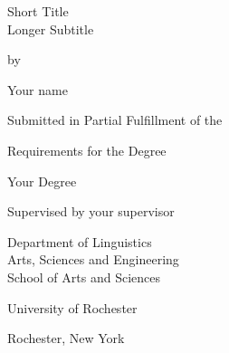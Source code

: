 \begin{titlepage}
  \vspace*{\fill}

  \begin{center}
    {\Huge Short Title \\ Longer Subtitle \par
    }

    \bigskip%
    by

    \bigskip%
    Your name


    \bigskip\bigskip\bigskip\bigskip%
    Submitted in Partial Fulfillment of the

    \bigskip%
    Requirements for the Degree

    \bigskip%
    Your Degree


    \bigskip\bigskip\bigskip\bigskip%
    Supervised by your supervisor

    \bigskip\bigskip%
    Department of Linguistics\\
    Arts, Sciences and Engineering\\
    School of Arts and Sciences


    \bigskip\bigskip\bigskip\bigskip%
    University of Rochester

    \bigskip%
    Rochester, New York


    \bigskip\bigskip\bigskip{}
  \end{center}

  \vspace*{\fill}
\end{titlepage}